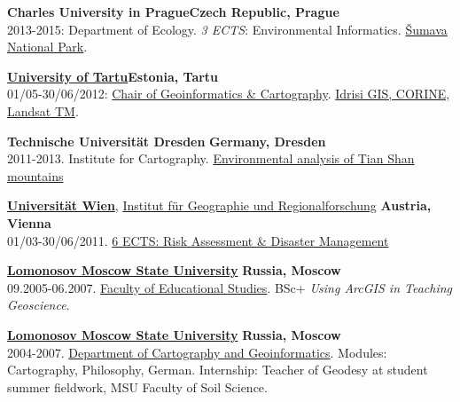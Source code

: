 \documentclass[10pt]{article}
\begin{document}
\textbf{Charles University in Prague}\hfill{\textbf{Czech Republic, Prague}}\\
2013-2015: Department of Ecology. \textit{3 ECTS}: Environmental Informatics. \href{https://www.researchgate.net/project/2013-2015-Czech-Republic-Sumava-National-Park-Environmental-Analysis}{Šumava National Park}.
\vspace{3pt}

\href{http://www.ut.ee/et}{\textbf{University of Tartu}}\hfill{\textbf{Estonia, Tartu}}\\ 01/05-30/06/2012: \href{https://www.geograafia.ut.ee/et}{Chair of Geoinformatics \& Cartography}. \href{https://www.researchgate.net/project/2012-Estonia-Tartu-IDRISI-GIS-and-CORINE-for-Mapping-Land-Cover-Changes}{Idrisi GIS, CORINE, Landsat TM}.
\vspace{3pt}

\textbf{Technische Universit\"at Dresden} \hfill{\textbf{Germany, Dresden}}\\	
2011-2013. Institute for Cartography. \href{https://www.researchgate.net/project/2011-2013-Germany-TU-Dresden-Environmental-Analysis-of-Tian-Shan-Region-Central-Asia}{Environmental analysis of Tian Shan mountains} 
\vspace{3pt}

\href{http://www.univie.ac.at/}{\textbf{Universit\"at Wien}}, \href{http://www.univie.ac.at/geographie/} {Institut f\"ur Geographie und Regionalforschung} \hfill{\textbf{Austria, Vienna}}\\
01/03-30/06/2011. \href{https://drive.google.com/file/d/1TH5GgB_lV5K1aJVwp3_9aYaqqZMgd7op/view?usp=sharing}{6 ECTS: Risk Assessment \& Disaster Management} \vspace{3pt}


\href{http://www.msu.ru/en/}{\textbf{Lomonosov Moscow State University}}
\hfill{\textbf{Russia, Moscow}}\\
09.2005-06.2007. \href{http://www.msu.ru/en/info/struct/depts/teach.html}{Faculty of Educational Studies}. BSc+ \emph{Using ArcGIS in Teaching Geoscience}.\vspace{3pt}

\href{http://www.msu.ru/en/}{\textbf{Lomonosov Moscow State University}}
\hfill{\textbf{Russia, Moscow}}\\
2004-2007. \href{http://www.eng.geogr.msu.ru/}{Department of Cartography and Geoinformatics}. Modules: Cartography, Philosophy, German. Internship: Teacher of Geodesy at student summer fieldwork, MSU Faculty of Soil Science.
\end{document}
